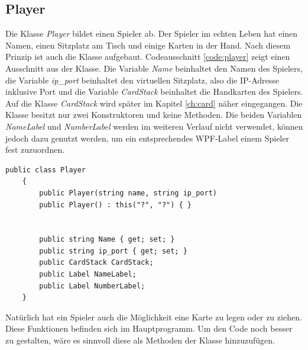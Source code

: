 \subsection{Player}
Die Klasse \textit{Player} bildet einen Spieler ab. Der Spieler im echten Leben hat einen Namen, einen Sitzplatz am Tisch und einige Karten in der Hand. Nach diesem Prinzip ist auch die Klasse aufgebaut. Codeausschnitt \ref{code:player} zeigt einen Ausschnitt aus der Klasse. Die Variable \textit{Name} beinhaltet den Namen des Spielers, die Variable \textit{ip\_port} beinhaltet den virtuellen Sitzplatz, also die IP-Adresse inklusive Port und die Variable \textit{CardStack} beinhaltet die Handkarten des Spielers. Auf die Klasse \textit{CardStack} wird später im Kapitel \ref{ch:card} näher eingegangen. Die Klasse besitzt nur zwei Konstruktoren und keine Methoden. Die beiden Variablen \textit{NameLabel} und \textit{NumberLabel} werden im weiteren Verlauf nicht verwendet, können jedoch dazu genutzt werden, um ein entsprechendes WPF-Label einem Spieler fest zuzuordnen.
\begin{lstlisting}[label=code:player, caption={Codeausschnitt Klasse \textit{Player}}]
 	public class Player
	{
		public Player(string name, string ip_port)
		public Player() : this("?", "?") { }
		
		
		public string Name { get; set; }
		public string ip_port { get; set; }
		public CardStack CardStack;
		public Label NameLabel;
		public Label NumberLabel;
	}
\end{lstlisting}
Natürlich hat ein Spieler auch die Möglichkeit eine Karte zu legen oder zu ziehen. Diese Funktionen befinden sich im Hauptprogramm. Um den Code noch besser zu gestalten, wäre es sinnvoll diese als Methoden der Klasse hinzuzufügen.


